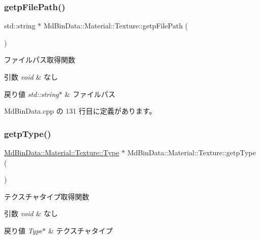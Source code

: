 \subsubsection{\texorpdfstring{getp\+File\+Path()}{getpFilePath()}}
{\footnotesize\ttfamily std\+::string $\ast$ Md\+Bin\+Data\+::\+Material\+::\+Texture\+::getp\+File\+Path (\begin{DoxyParamCaption}{ }\end{DoxyParamCaption})}



ファイルパス取得関数 


\begin{DoxyParams}{引数}
{\em void} & なし \\
\hline
\end{DoxyParams}

\begin{DoxyRetVals}{戻り値}
{\em std\+::string$\ast$} & ファイルパス \\
\hline
\end{DoxyRetVals}


 Md\+Bin\+Data.\+cpp の 131 行目に定義があります。

\mbox{\label{class_md_bin_data_1_1_material_1_1_texture_a88cd7f1ff4374f7cd0e915bbb875f7c9}} 
\subsubsection{\texorpdfstring{getp\+Type()}{getpType()}}
{\footnotesize\ttfamily \mbox{\hyperlink{class_md_bin_data_1_1_material_1_1_texture_a30fadb7216d0650de284e2fd875868ae}{Md\+Bin\+Data\+::\+Material\+::\+Texture\+::\+Type}} $\ast$ Md\+Bin\+Data\+::\+Material\+::\+Texture\+::getp\+Type (\begin{DoxyParamCaption}{ }\end{DoxyParamCaption})}



テクスチャタイプ取得関数 


\begin{DoxyParams}{引数}
{\em void} & なし \\
\hline
\end{DoxyParams}

\begin{DoxyRetVals}{戻り値}
{\em Type$\ast$} & テクスチャタイプ \\
\hline
\end{DoxyRetVals}


